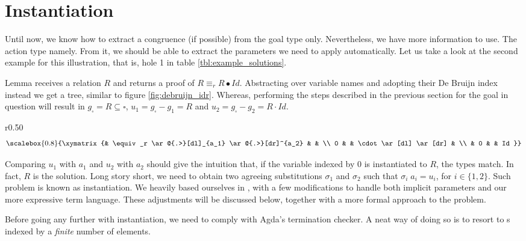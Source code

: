\section{Instantiation}

Until now, we know how to extract a congruence (if possible) from the goal type only. Nevertheless,
we have more information to use. The action type namely. From it, we should be able to extract
the parameters we need to apply automatically. Let us take a look at the second example
for this illustration, that is, hole 1 in table \ref{tbl:example_solutions}.

Lemma  receives a relation $R$ and returns a proof of $R \equiv_r R ∙ Id$. Abstracting
over variable names and adopting their De Bruijn index instead we get a tree, similar to figure \ref{fig:debruijn_idr}. Whereas, performing the steps described in the previous section
for the goal in question will result in $g_\square = R \subseteq \square$, $u_1 = g_\square - g_1 = R$
and $u_2 = g_\square - g_2 = R \cdot Id$.

\begin{wrapfigure}{r}{0.50\textwidth}
\begin{displaymath}
\scalebox{0.8}{%
\xymatrix{%
 & \equiv_r \ar@{.>}[dl]_{a_1} \ar@{.>}[dr]^{a_2} & & \\
0 & & \cdot \ar[dl] \ar[dr] & \\
& 0 & & Id
}}
\end{displaymath}
\caption{'s type}
\label{fig:debruijn_idr}
\end{wrapfigure}

Comparing $u_1$ with $a_1$ and $u_2$ with $a_2$ should give the intuition that, if the
variable indexed by $0$ is instantiated to $R$, the types match. In fact, $R$ is the solution.
Long story short, we need to obtain two agreeing substitutions $\sigma_1$ and $\sigma_2$ such
that $\sigma_i\;a_i = u_i$, for $i\in\{1 , 2\}$. Such problem is known as instantiation.
We heavily based ourselves in \cite{wouter13}, with a few modifications to handle both implicit
parameters and our more expressive term language. These adjustments will be discussed below,
together with a more formal approach to the problem.

Before going any further with instantiation, we need to comply with Agda's termination checker.
A neat way of doing so is to resort to s indexed by a \emph{finite} number of elements.


